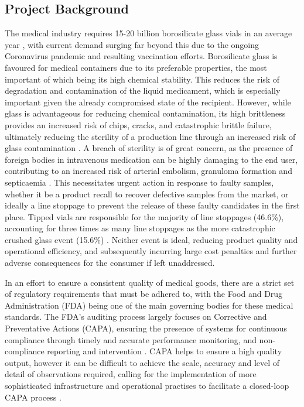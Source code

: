 \documentclass[10pt]{article}
\begin{document}
\subsection{Project Background}
The medical industry requires 15-20 billion borosilicate glass vials in an average year \cite{ludwig_burger_2020}, with current demand surging far beyond this due to the ongoing Coronavirus pandemic and resulting vaccination efforts. Borosilicate glass is favoured for medical containers due to its preferable properties, the most important of which being its high chemical stability. This reduces the risk of degradation and contamination of the liquid medicament, which is especially important given the already compromised state of the recipient. However, while glass is advantageous for reducing chemical contamination, its high brittleness provides an increased risk of chips, cracks, and catastrophic brittle failure, ultimately reducing the sterility of a production line through an increased risk of glass contamination \cite{john_erdner_2019}. A breach of sterility is of great concern, as the presence of foreign bodies in intravenous medication can be highly damaging to the end user, contributing to an increased risk of arterial embolism, granuloma formation and septicaemia \cite{shaw_lyall_1985}. This necessitates urgent action in response to faulty samples, whether it be a product recall to recover defective samples from the market, or ideally a line stoppage to prevent the release of these faulty candidates in the first place. Tipped vials are responsible for the majority of line stoppages (46.6\%), accounting for three times as many line stoppages as the more catastrophic crushed glass event (15.6\%) \cite{9029267}. Neither event is ideal, reducing product quality and operational efficiency, and subsequently incurring large cost penalties and further adverse consequences for the consumer if left unaddressed.

In an effort to ensure a consistent quality of medical goods, there are a strict set of regulatory requirements that must be adhered to, with the Food and Drug Administration (FDA) being one of the main governing bodies for these medical standards. The FDA's auditing process largely focuses on Corrective and Preventative Actions (CAPA), ensuring the presence of systems for continuous compliance through timely and accurate performance monitoring, and non-compliance reporting and intervention \cite{capa_2014}. CAPA helps to ensure a high quality output, however it can be difficult to achieve the scale, accuracy and level of detail of observations required, calling for the implementation of more sophisticated infrastructure and operational practises to facilitate a closed-loop CAPA process \cite{bsi-capa}.
\end{document}

